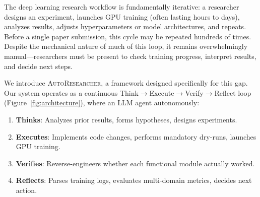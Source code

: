 \documentclass[11pt,a4paper]{article}
\newcommand{\sysname}{\textsc{AutoResearcher}}
\begin{document}
The deep learning research workflow is fundamentally iterative: a researcher designs an experiment, launches GPU training (often lasting hours to days), analyzes results, adjusts hyperparameters or model architectures, and repeats.
Before a single paper submission, this cycle may be repeated hundreds of times.
Despite the mechanical nature of much of this loop, it remains overwhelmingly manual---researchers must be present to check training progress, interpret results, and decide next steps.

We introduce \sysname, a framework designed specifically for this gap.
Our system operates as a continuous Think$\to$Execute$\to$Verify$\to$Reflect loop (Figure~\ref{fig:architecture}), where an LLM agent autonomously:

\begin{enumerate}[nosep]
\item \textbf{Thinks}: Analyzes prior results, forms hypotheses, designs experiments.
\item \textbf{Executes}: Implements code changes, performs mandatory dry-runs, launches GPU training.
\item \textbf{Verifies}: Reverse-engineers whether each functional module actually worked.
\item \textbf{Reflects}: Parses training logs, evaluates multi-domain metrics, decides next action.
\end{enumerate}
\end{document}
